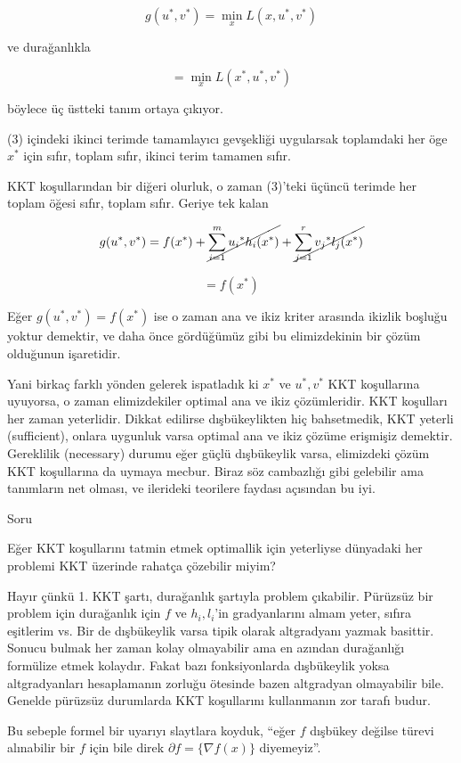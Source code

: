 \documentclass[12pt,fleqn]{article}\usepackage{../../common}
\begin{document}
$$
g(u^\ast,v^\ast) = \min_x L(x,u^\ast,v^\ast)
$$

ve durağanlıkla 

$$
= \min_x L(x^\ast,u^\ast,v^\ast)
$$

böylece üç üstteki tanım ortaya çıkıyor. 

(3) içindeki ikinci terimde tamamlayıcı gevşekliği uygularsak toplamdaki
her öge $x^\ast$ için sıfır, toplam sıfır, ikinci terim tamamen sıfır.

KKT koşullarından bir diğeri olurluk, o zaman (3)'teki üçüncü terimde her
toplam öğesi sıfır, toplam sıfır. Geriye tek kalan

$$
g(u^\ast,v^\ast) = f(x^\ast) + 
\cancel{\sum_{i=1}^{m} u_i{^\ast} h_i(x^\ast)} + 
\cancel{\sum_{j=1}^{r} v_j{^\ast} l_j(x^\ast)}
$$

$$
= f(x^\ast)
$$

Eğer $g(u^\ast,v^\ast) = f(x^\ast)$ ise o zaman ana ve ikiz kriter arasında ikizlik
boşluğu yoktur demektir, ve daha önce gördüğümüz gibi bu elimizdekinin bir
çözüm olduğunun işaretidir. 

Yani birkaç farklı yönden gelerek ispatladık ki $x^\ast$ ve $u^\ast,v^\ast$
KKT koşullarına uyuyorsa, o zaman elimizdekiler optimal ana ve ikiz
çözümleridir. KKT koşulları her zaman yeterlidir. Dikkat edilirse
dışbükeylikten hiç bahsetmedik, KKT yeterli (sufficient), onlara uygunluk
varsa optimal ana ve ikiz çözüme erişmişiz demektir. Gereklilik (necessary)
durumu eğer güçlü dışbükeylik varsa, elimizdeki çözüm KKT koşullarına da
uymaya mecbur. Biraz söz cambazlığı gibi gelebilir ama tanımların net
olması, ve ilerideki teorilere faydası açısından bu iyi. 

Soru

Eğer KKT koşullarını tatmin etmek optimallik için yeterliyse dünyadaki her
problemi KKT üzerinde rahatça çözebilir miyim?

Hayır çünkü 1. KKT şartı, durağanlık şartıyla problem çıkabilir. Pürüzsüz
bir problem için durağanlık için $f$ ve $h_i,l_i$'in gradyanlarını almam
yeter, sıfıra eşitlerim vs. Bir de dışbükeylik varsa tipik olarak
altgradyanı yazmak basittir. Sonucu bulmak her zaman kolay olmayabilir ama
en azından durağanlığı formülize etmek kolaydır. Fakat bazı fonksiyonlarda
dışbükeylik yoksa altgradyanları hesaplamanın zorluğu ötesinde bazen
altgradyan olmayabilir bile. Genelde pürüzsüz durumlarda KKT koşullarını
kullanmanın zor tarafı budur.

Bu sebeple formel bir uyarıyı slaytlara koyduk, ``eğer $f$ dışbükey değilse
türevi alınabilir bir $f$ için bile direk $\partial f = \{\nabla f(x)\}$
diyemeyiz''. 
\end{document}
